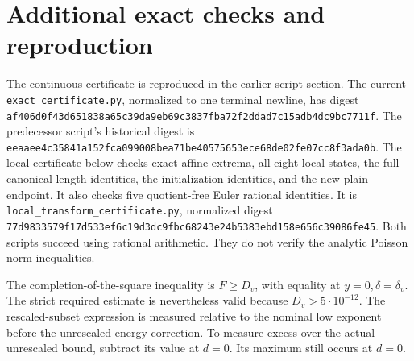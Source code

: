 \documentclass[12pt]{article}
\begin{document}
\section{Additional exact checks and reproduction}
The continuous certificate is reproduced in the earlier script section.
The current \texttt{exact\_certificate.py}, normalized to one terminal
newline, has digest
\nolinkurl{af406d0f43d651838a65c39da9eb69c3837fba72f2ddad7c15adb4dc9bc7711f}.
The predecessor script's historical digest is
\nolinkurl{eeaaee4c35841a152fca099008bea71be40575653ece68de02fe07cc8f3ada0b}.
The local certificate below checks exact affine extrema,
all eight local states, the full canonical length identities,
the initialization identities, and the new plain endpoint.
It also checks five quotient-free Euler rational identities.
It is \texttt{local\_transform\_certificate.py}, normalized digest
\nolinkurl{77d9833579f17d533ef6c19d3dc9fbc68243e24b5383ebd158e656c39086fe45}.
Both scripts succeed using rational arithmetic.
They do not verify the analytic Poisson norm inequalities.

The completion-of-the-square inequality is \(F\ge D_v\), with
equality at \(y=0,\delta=\delta_v\).  The strict required estimate
is nevertheless valid because \(D_v>5\cdot10^{-12}\).
The rescaled-subset expression is measured relative to the
nominal low exponent before the unrescaled energy correction.
To measure excess over the actual unrescaled bound, subtract its
value at \(d=0\).  Its maximum still occurs at \(d=0\).
\end{document}
